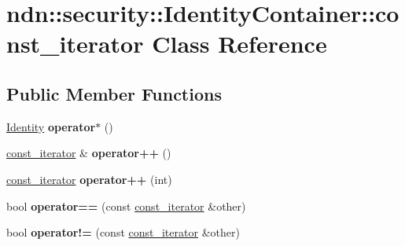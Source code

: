 \hypertarget{classndn_1_1security_1_1IdentityContainer_1_1const__iterator}{}\section{ndn\+:\+:security\+:\+:Identity\+Container\+:\+:const\+\_\+iterator Class Reference}
\label{classndn_1_1security_1_1IdentityContainer_1_1const__iterator}
\subsection*{Public Member Functions}
\begin{DoxyCompactItemize}
\item 
\hyperlink{classndn_1_1security_1_1Identity}{Identity} {\bfseries operator$\ast$} ()\hypertarget{classndn_1_1security_1_1IdentityContainer_1_1const__iterator_a496fbd6ff34bc02a583edecceb4ff19b}{}\label{classndn_1_1security_1_1IdentityContainer_1_1const__iterator_a496fbd6ff34bc02a583edecceb4ff19b}

\item 
\hyperlink{classndn_1_1security_1_1IdentityContainer_1_1const__iterator}{const\+\_\+iterator} \& {\bfseries operator++} ()\hypertarget{classndn_1_1security_1_1IdentityContainer_1_1const__iterator_aef55770fbe6e970226486aa6b19a6d4c}{}\label{classndn_1_1security_1_1IdentityContainer_1_1const__iterator_aef55770fbe6e970226486aa6b19a6d4c}

\item 
\hyperlink{classndn_1_1security_1_1IdentityContainer_1_1const__iterator}{const\+\_\+iterator} {\bfseries operator++} (int)\hypertarget{classndn_1_1security_1_1IdentityContainer_1_1const__iterator_a28e15d73b26578db586835dda376c7dd}{}\label{classndn_1_1security_1_1IdentityContainer_1_1const__iterator_a28e15d73b26578db586835dda376c7dd}

\item 
bool {\bfseries operator==} (const \hyperlink{classndn_1_1security_1_1IdentityContainer_1_1const__iterator}{const\+\_\+iterator} \&other)\hypertarget{classndn_1_1security_1_1IdentityContainer_1_1const__iterator_a3ef97d401636ebd03975ac2b133c43d4}{}\label{classndn_1_1security_1_1IdentityContainer_1_1const__iterator_a3ef97d401636ebd03975ac2b133c43d4}

\item 
bool {\bfseries operator!=} (const \hyperlink{classndn_1_1security_1_1IdentityContainer_1_1const__iterator}{const\+\_\+iterator} \&other)\hypertarget{classndn_1_1security_1_1IdentityContainer_1_1const__iterator_a9d09e291813971ce0d7dfaf422240bd8}{}\label{classndn_1_1security_1_1IdentityContainer_1_1const__iterator_a9d09e291813971ce0d7dfaf422240bd8}

\end{DoxyCompactItemize}
